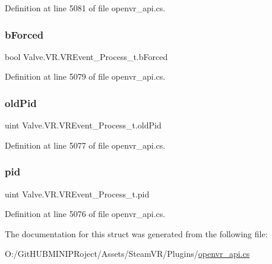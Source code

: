 Definition at line 5081 of file openvr\+\_\+api.\+cs.

\mbox{\label{struct_valve_1_1_v_r_1_1_v_r_event___process__t_aa21f1d68c620e6a1b6a468afb265ef77}} 
\subsubsection{\texorpdfstring{bForced}{bForced}}
{\footnotesize\ttfamily bool Valve.\+V\+R.\+V\+R\+Event\+\_\+\+Process\+\_\+t.\+b\+Forced}



Definition at line 5079 of file openvr\+\_\+api.\+cs.

\mbox{\label{struct_valve_1_1_v_r_1_1_v_r_event___process__t_a81806e9988d82951c56534b8c451e502}} 
\subsubsection{\texorpdfstring{oldPid}{oldPid}}
{\footnotesize\ttfamily uint Valve.\+V\+R.\+V\+R\+Event\+\_\+\+Process\+\_\+t.\+old\+Pid}



Definition at line 5077 of file openvr\+\_\+api.\+cs.

\mbox{\label{struct_valve_1_1_v_r_1_1_v_r_event___process__t_a75e5d1c317b6bad48e9fb6e35967e761}} 
\subsubsection{\texorpdfstring{pid}{pid}}
{\footnotesize\ttfamily uint Valve.\+V\+R.\+V\+R\+Event\+\_\+\+Process\+\_\+t.\+pid}



Definition at line 5076 of file openvr\+\_\+api.\+cs.



The documentation for this struct was generated from the following file\+:\begin{DoxyCompactItemize}
\item 
O\+:/\+Git\+H\+U\+B\+M\+I\+N\+I\+P\+Roject/\+Assets/\+Steam\+V\+R/\+Plugins/\mbox{\hyperlink{openvr__api_8cs}{openvr\+\_\+api.\+cs}}\end{DoxyCompactItemize}
